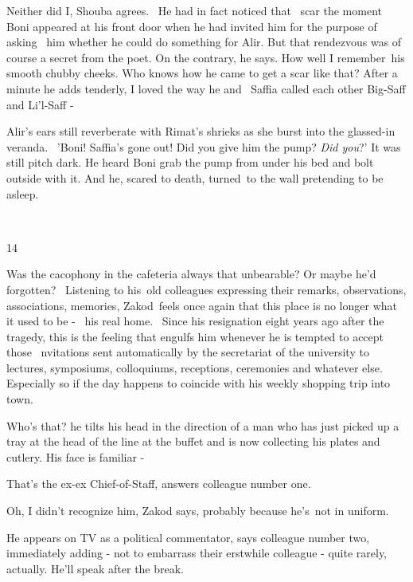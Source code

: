 \documentclass[letterpaper]{article}
\begin{document}
{\textquotedbl}Neither did I,{\textquotedbl} Shouba agrees. \ He had in fact noticed that \ scar the moment Boni
appeared at his front door when he had invited him for the purpose of asking \ him whether he could do something for
Alir. But that rendezvous was of course a secret from the poet. {\textquotedbl}On the contrary,{\textquotedbl} he says.
{\textquotedbl}How well I remember~his smooth chubby cheeks. Who knows how he came to get a scar like
that?{\textquotedbl} After a minute he adds tenderly, {\textquotedbl}I loved the way he and~ Saffia called each other
Big-Saff and Li'l-Saff -{\textquotedbl}

Alir's ears still reverberate with Rimat's shrieks as she burst into the glassed-in veranda. \ {}'Boni! Saffia's gone
out! Did you give him the pump? \textit{Did you}?' It was still pitch dark. He heard Boni grab the pump from under his
bed and bolt outside with it. And he, scared to death, turned~to the wall pretending to be asleep.

~

14 

Was the cacophony in the cafeteria always that unbearable? Or maybe he'd forgotten? ~Listening to his~old colleagues
expressing their remarks, observations, associations, memories, Zakod~feels once again that this place is no longer
what it used to be -~ his real home. ~Since his resignation eight years ago after the tragedy, this is the feeling that
engulfs him whenever he is tempted to accept those \ nvitations sent automatically by the secretariat of the university
to lectures, symposiums, colloquiums, receptions, ceremonies and whatever else. Especially so if the day happens to
coincide with his weekly shopping trip into town. 

{\textquotedbl}Who's that?{\textquotedbl} he tilts his head in the direction of a man who has just picked up a tray at
the head of the line at the buffet and is now collecting his plates and cutlery. {\textquotedbl}His face is familiar
-{\textquotedbl} 

{\textquotedbl}That's the ex-ex Chief-of-Staff,{\textquotedbl} answers colleague number one. 

{\textquotedbl}Oh, I didn't recognize him,{\textquotedbl} Zakod says, {\textquotedbl}probably because he's~not in
uniform.{\textquotedbl} ~

{\textquotedbl}He appears on TV as a political commentator,{\textquotedbl} says colleague number two, immediately adding
- not to embarrass their erstwhile colleague - {\textquotedbl}quite rarely, actually. He'll speak after the
break.{\textquotedbl} 
\end{document}
